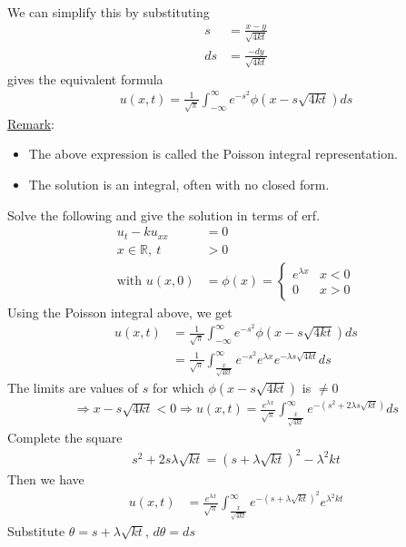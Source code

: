 \documentclass[12pt, letterpaper]{article}
\begin{document}
We can simplify this by substituting 
\begin{align*}
    s &= \frac{x-y}{\sqrt{4kt}} \\
    ds &= \frac{-dy}{\sqrt{4kt}}
\end{align*}
gives the equivalent formula
\begin{align*}
    u(x,t) = \frac{1}{\sqrt{\pi}} \int_{-\infty}^{\infty} e^{-s^2}\phi(x-s\sqrt{4kt})ds
\end{align*}
\underline{Remark}:
\begin{itemize}
    \item The above expression is called the Poisson integral representation.
    \item The solution is an integral, often with no closed form.
\end{itemize}
 Solve the following and give the solution in terms of erf.
\begin{align*}
    u_t - ku_{xx} &= 0 \\
    x\in \mathbb{R},\ t &> 0 \\
    \text{with } u(x,0) &= \phi(x) = \begin{cases}
        e^{\lambda x} & x < 0 \\
        0 & x > 0 
    \end{cases}
\end{align*}
Using the Poisson integral above, we get 
\begin{align*}
    u(x,t) &= \frac{1}{\sqrt{\pi}} \int_{-\infty}^{\infty} e^{-s^2}\phi(x-s\sqrt{4kt})ds \\
    &= \frac{1}{\sqrt{\pi}} \int_{\frac{x}{\sqrt{4kt}}}^{\infty} e^{-s^2} e^{\lambda x} e^{-\lambda s\sqrt{4kt}}ds
\end{align*}
The limits are values of $s$ for which $\phi(x-s\sqrt{4kt})$ is $\ne 0$
\begin{align*}
    \Rightarrow x - s\sqrt{4kt} < 0
    \Rightarrow u(x,t) = \frac{e^{\lambda x}}{\sqrt \pi} \int_{\frac{x}{\sqrt{4kt}}}^{\infty} e^{-(s^2+2\lambda s\sqrt{kt})}ds
\end{align*}
Complete the square
\begin{align*}
    s^2 + 2s\lambda \sqrt{kt} = (s+\lambda\sqrt{kt})^2 - \lambda^2kt
\end{align*}
Then we have 
\begin{align*}
    u(x,t) &= \frac{e^{\lambda x}}{\sqrt{\pi}} \int_{\frac{x}{\sqrt{4kt}}}^{\infty} e^{-(s+\lambda\sqrt{kt})^2}e^{\lambda^2kt}
\end{align*}
Substitute $\theta = s + \lambda \sqrt{kt}$, $d\theta = ds$
\end{document}
